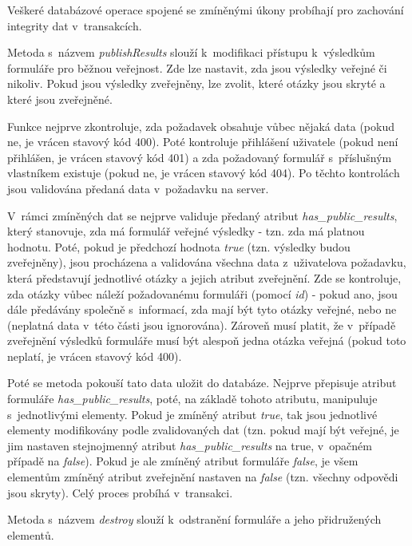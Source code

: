 			Veškeré databázové operace spojené se zmíněnými úkony probíhají pro zachování integrity dat v~transakcích.
			
			\label{sec:form_publish_results}
			Metoda s~názvem \textit{publishResults} slouží k~modifikaci přístupu k~výsledkům formuláře pro běžnou veřejnost. Zde lze nastavit, zda jsou výsledky veřejné či nikoliv. Pokud jsou výsledky zveřejněny, lze zvolit, které otázky jsou skryté a které jsou zveřejněné.
			
			Funkce nejprve zkontroluje, zda požadavek obsahuje vůbec nějaká data (pokud ne, je vrácen stavový kód 400). Poté kontroluje přihlášení uživatele (pokud není přihlášen, je vrácen stavový kód 401) a zda požadovaný formulář s~příslušným vlastníkem existuje (pokud ne, je vrácen stavový kód 404). Po těchto kontrolách jsou validována předaná data v~požadavku na server.
			
			V~rámci zmíněných dat se nejprve validuje předaný atribut \textit{has\_public\_results}, který stanovuje, zda má formulář veřejné výsledky - tzn. zda má platnou hodnotu. Poté, pokud je předchozí hodnota \textit{true} (tzn. výsledky budou zveřejněny), jsou procházena a validována všechna data z~uživatelova požadavku, která představují jednotlivé otázky a jejich atribut zveřejnění. Zde se kontroluje, zda otázky vůbec náleží požadovanému formuláři (pomocí \textit{id}) - pokud ano, jsou dále předávány společně s~informací, zda mají být tyto otázky veřejné, nebo ne (neplatná data v~této části jsou ignorována). Zároveň musí platit, že v~případě zveřejnění výsledků formuláře musí být alespoň jedna otázka veřejná (pokud toto neplatí, je vrácen stavový kód 400).
			
			Poté se metoda pokouší tato data uložit do databáze. Nejprve přepisuje atribut formuláře \textit{has\_public\_results}, poté, na základě tohoto atributu, manipuluje s~jednotlivými elementy. Pokud je zmíněný atribut \textit{true}, tak jsou jednotlivé elementy modifikovány podle zvalidovaných dat (tzn. pokud mají být veřejné, je jim nastaven stejnojmenný atribut \textit{has\_public\_results} na true, v~opačném případě na \textit{false}). Pokud je ale zmíněný atribut formuláře \textit{false}, je všem elementům zmíněný atribut zveřejnění nastaven na \textit{false} (tzn. všechny odpovědi jsou skryty). Celý proces probíhá v~transakci.
			
			\label{sec:form_destroy}
			Metoda s~názvem \textit{destroy} slouží k~odstranění formuláře a jeho přidružených elementů.
			
